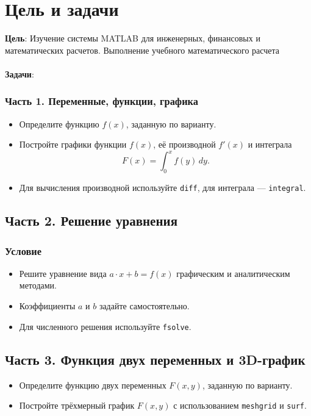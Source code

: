 \chapter*{Цель и задачи}
\label{ch:intro}

\textbf{Цель}: Изучение системы MATLAB для инженерных,
финансовых и математических расчетов. Выполнение учебного
математического расчета \\
\\\textbf{Задачи}:

\subsection*{Часть 1. Переменные, функции, графика}

\begin{itemize}
  \item Определите функцию \(f(x)\), заданную по варианту.
  \item Постройте графики функции \(f(x)\), её производной \(f'(x)\) и интеграла
  \[
    F(x) = \int_{0}^{x} f(y)\,dy.
  \]
  \item Для вычисления производной используйте \texttt{diff}, для интеграла — \texttt{integral}.
\end{itemize}

\section*{Часть 2. Решение уравнения}

\subsection*{Условие}
\begin{itemize}
  \item Решите уравнение вида \(a\cdot x + b = f(x)\) графическим и аналитическим методами.
  \item Коэффициенты \(a\) и \(b\) задайте самостоятельно.
  \item Для численного решения используйте \texttt{fsolve}.
\end{itemize}

\section*{Часть 3. Функция двух переменных и 3D-график}

\begin{itemize}
  \item Определите функцию двух переменных \(F(x,y)\), заданную по варианту.
  \item Постройте трёхмерный график \(F(x,y)\) с использованием \texttt{meshgrid} и \texttt{surf}.
\end{itemize}

